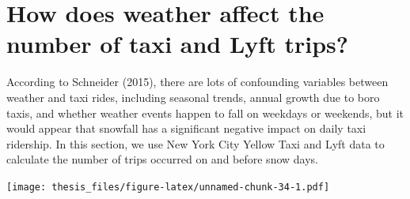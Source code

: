 \documentclass[12pt,twoside]{reedthesis}
\newenvironment{Shaded}{\begin{snugshade}}{\end{snugshade}}
\newcommand{\KeywordTok}[1]{\textcolor[rgb]{0.13,0.29,0.53}{\textbf{#1}}}
\newcommand{\DataTypeTok}[1]{\textcolor[rgb]{0.13,0.29,0.53}{#1}}
\newcommand{\DecValTok}[1]{\textcolor[rgb]{0.00,0.00,0.81}{#1}}
\newcommand{\StringTok}[1]{\textcolor[rgb]{0.31,0.60,0.02}{#1}}
\newcommand{\OperatorTok}[1]{\textcolor[rgb]{0.81,0.36,0.00}{\textbf{#1}}}
\newcommand{\NormalTok}[1]{#1}
\theoremstyle{definition}
\theoremstyle{definition}
\theoremstyle{definition}
\theoremstyle{remark}
\begin{document}
\section{How does weather affect the number of taxi and Lyft
trips?}\label{how-does-weather-affect-the-number-of-taxi-and-lyft-trips}

According to Schneider (2015), there are lots of confounding variables
between weather and taxi rides, including seasonal trends, annual growth
due to boro taxis, and whether weather events happen to fall on weekdays
or weekends, but it would appear that snowfall has a significant
negative impact on daily taxi ridership. In this section, we use New
York City Yellow Taxi and Lyft data to calculate the number of trips
occurred on and before snow days.
\begin{Shaded}
\end{Shaded}
\texttt{[image: thesis\_files/figure-latex/unnamed-chunk-34-1.pdf]}
\end{document}

